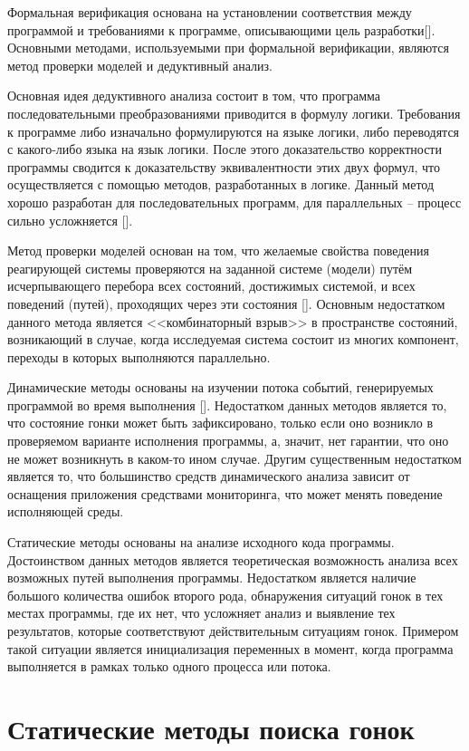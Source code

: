 Формальная верификация основана на установлении соответствия между программой и требованиями к программе, описывающими цель разработки[]. Основными методами, используемыми при формальной верификации, являются метод проверки моделей и дедуктивный анализ.

Основная идея дедуктивного анализа состоит в том, что программа  последовательными преобразованиями приводится в формулу логики. Требования к программе либо изначально формулируются на языке логики, либо переводятся с какого-либо языка на язык логики. После этого доказательство корректности программы сводится к доказательству эквивалентности этих двух формул, что осуществляется с помощью методов, разработанных в логике. Данный метод хорошо разработан для последовательных программ, для параллельных – процесс сильно усложняется [].

Метод проверки моделей основан на том, что желаемые свойства поведения реагирующей системы проверяются на заданной системе (модели) путём исчерпывающего перебора всех состояний, достижимых системой, и всех поведений (путей), проходящих через эти состояния []. Основным недостатком данного метода является <<комбинаторный взрыв>> в пространстве состояний, возникающий в случае, когда исследуемая система состоит из многих компонент, переходы в которых выполняются параллельно.

Динамические методы основаны на изучении потока событий, генерируемых программой во время выполнения []. Недостатком данных методов является то, что состояние гонки может быть зафиксировано, только если оно возникло в проверяемом  варианте исполнения программы, а, значит, нет гарантии, что оно не может возникнуть в каком-то ином случае. Другим существенным недостатком является то, что большинство средств динамического анализа зависит от оснащения приложения средствами мониторинга, что может менять поведение исполняющей среды.

Статические методы основаны на анализе исходного кода программы. Достоинством данных методов является теоретическая возможность анализа всех возможных путей выполнения программы. Недостатком является наличие большого количества ошибок второго рода,  обнаружения ситуаций гонок в тех местах программы, где их нет, что усложняет анализ и выявление тех результатов, которые соответствуют действительным ситуациям гонок. Примером такой ситуации является инициализация переменных в момент, когда программа выполняется в рамках только одного процесса или потока.

\section{Статические методы поиска гонок}

